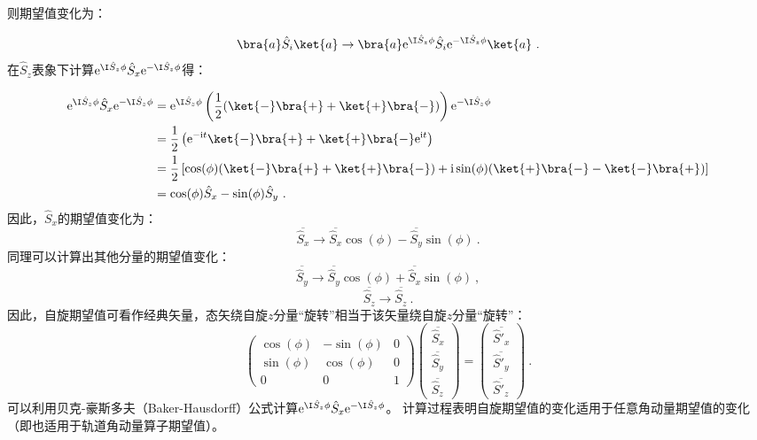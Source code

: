 则期望值变化为：

\begin{equation}
\bra{a}\hat S_i\ket{a}\rightarrow \bra{a}\mathrm e^{ \I\hat S_z\phi}\hat S_i\mathrm e^{- \I\hat S_z\phi}\ket{a}~.
\end{equation}
在$\hat S_z$表象下计算$\mathrm e^{ \I\hat S_z\phi}\hat S_x\mathrm e^{- \I\hat S_z\phi }$得：

\begin{equation}
\begin{aligned}
\mathrm e^{ \I\hat S_z\phi}\hat S_x\mathrm e^{- \I\hat S_z\phi}&=\mathrm e^{ \I\hat S_z\phi}\left(\frac{1}{2}(\ket{-}\bra{+}+\ket{+}\bra{-})\right)\mathrm e^{- \I\hat S_z\phi}\\
 &=\frac{1}{2}\left(\mathrm e^{-\mathrm i t}\ket{-}\bra{+}+\ket{+}\bra{-}\mathrm e^{\mathrm i t}\right)\\
 &=\frac{1}{2}\left[\cos(\phi)(\ket{-}\bra{+}+\ket{+}\bra{-})+\mathrm i\sin(\phi)(\ket{+}\bra{-}-\ket{-}\bra{+})\right]\\
 &=\cos(\phi) \hat S_x-\sin(\phi) \hat S_y~.
\end{aligned}
\end{equation}
因此，$\hat S_x$的期望值变化为：
\begin{equation}
\overline{\hat S_x}\rightarrow  \overline{\hat S_x}\cos(\phi)-\overline{\hat S_y}\sin(\phi)~.
\end{equation}
同理可以计算出其他分量的期望值变化：
\begin{equation}
\overline{\hat S_y}\rightarrow \overline{\hat S_y}\cos(\phi)+\overline{\hat S_x}\sin(\phi)~,
\end{equation}
\begin{equation}
\overline{\hat S_z}\rightarrow \overline{\hat S_z}~.
\end{equation}
因此，自旋期望值可看作经典矢量，态矢绕自旋$z$分量“旋转”相当于该矢量绕自旋$z$分量“旋转”：
\begin{equation}
\begin{pmatrix}
 \cos(\phi) &-\sin(\phi)  &0 \\
  \sin(\phi) & \cos(\phi)  & 0\\
  0& 0 &1
\end{pmatrix}
\begin{pmatrix}
 \overline{\hat S_x}\\
  \overline{\hat S_y}\\
 \overline{\hat S_z}
\end{pmatrix}
=
\begin{pmatrix}
  \overline{\hat S'_x}\\
  \overline{\hat S'_y}\\
 \overline{\hat S'_z}
\end{pmatrix}~.
\end{equation}
可以利用贝克-豪斯多夫（Baker-Hausdorff）公式计算$\mathrm e^{ \I\hat S_z\phi}\hat S_x\mathrm e^{- \I\hat S_z\phi}$。
计算过程表明自旋期望值的变化适用于任意角动量期望值的变化（即也适用于轨道角动量算子期望值）。



